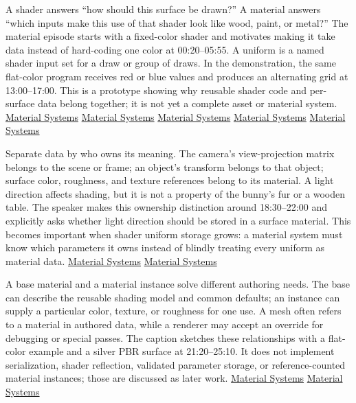\hypertarget{06-engine-ii-ch025-a-material-is-shared-shading-code-plus-surface-specific-data}{}

A shader answers ``how should this surface be drawn?'' A material answers ``which inputs make this use of that shader look like wood, paint, or metal?'' The material episode starts with a fixed-color shader and motivates making it take data instead of hard-coding one color at 00:20--05:55. A uniform is a named shader input set for a draw or group of draws. In the demonstration, the same flat-color program receives red or blue values and produces an alternating grid at 13:00--17:00. This is a prototype showing why reusable shader code and per-surface data belong together; it is not yet a complete asset or material system. \href{https://www.youtube.com/watch?v=2k5FjtMNQsM&t=20s}{Material Systems} \href{https://www.youtube.com/watch?v=2k5FjtMNQsM&t=210s}{Material Systems} \href{https://www.youtube.com/watch?v=2k5FjtMNQsM&t=330s}{Material Systems} \href{https://www.youtube.com/watch?v=2k5FjtMNQsM&t=780s}{Material Systems} \href{https://www.youtube.com/watch?v=2k5FjtMNQsM&t=960s}{Material Systems}

Separate data by who owns its meaning. The camera's view-projection matrix belongs to the scene or frame; an object's transform belongs to that object; surface color, roughness, and texture references belong to its material. A light direction affects shading, but it is not a property of the bunny's fur or a wooden table. The speaker makes this ownership distinction around 18:30--22:00 and explicitly asks whether light direction should be stored in a surface material. This becomes important when shader uniform storage grows: a material system must know which parameters it owns instead of blindly treating every uniform as material data. \href{https://www.youtube.com/watch?v=2k5FjtMNQsM&t=1080s}{Material Systems} \href{https://www.youtube.com/watch?v=2k5FjtMNQsM&t=1230s}{Material Systems}

A base material and a material instance solve different authoring needs. The base can describe the reusable shading model and common defaults; an instance can supply a particular color, texture, or roughness for one use. A mesh often refers to a material in authored data, while a renderer may accept an override for debugging or special passes. The caption sketches these relationships with a flat-color example and a silver PBR surface at 21:20--25:10. It does not implement serialization, shader reflection, validated parameter storage, or reference-counted material instances; those are discussed as later work. \href{https://www.youtube.com/watch?v=2k5FjtMNQsM&t=1280s}{Material Systems} \href{https://www.youtube.com/watch?v=2k5FjtMNQsM&t=1440s}{Material Systems}

